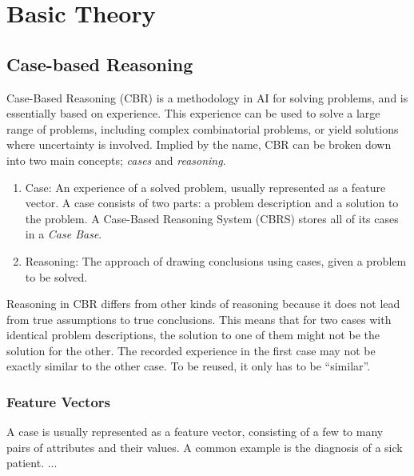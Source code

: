 
\chapter{Basic Theory}

\cleardoublepage


\section{Case-based Reasoning}
Case-Based Reasoning (CBR) is a methodology in AI for solving problems, and is essentially based on experience. This experience can be used to solve a large range of problems, including complex combinatorial problems, or yield solutions where uncertainty is involved. Implied by the name, CBR can be broken down into two main concepts; \textit{cases} and \textit{reasoning}.

\begin{enumerate}
    \item Case: An experience of a solved problem, usually represented as a feature vector. A case consists of two parts: a problem description and a solution to the problem. A Case-Based Reasoning System (CBRS) stores all of its cases in a \textit{Case Base}.
    \item Reasoning: The approach of drawing conclusions using cases, given a problem to be solved.
\end{enumerate}

Reasoning in CBR differs from other kinds of reasoning because it does not lead from true assumptions to true conclusions. This means that for two cases with identical problem descriptions, the solution to one of them might not be the solution for the other. The recorded experience in the first case may not be exactly similar to the other case. To be reused, it only has to be \enquote{similar}.

\subsection{Feature Vectors}
A case is usually represented as a feature vector, consisting of a few to many pairs of attributes and their values. A common example is the diagnosis of a sick patient. ...

